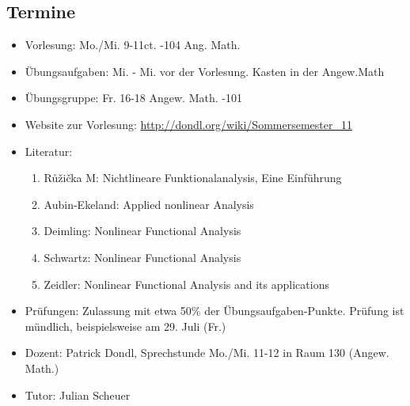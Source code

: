 \documentclass[14pt]{article}
\theoremstyle{plain}
\theoremstyle{nonumberplain}
\begin{document}
\subsection*{Termine}
\begin{itemize}
    \item Vorlesung: Mo./Mi. 9-11ct. -104 Ang. Math.
    \item Übungsaufgaben: Mi. - Mi. vor der Vorlesung. Kasten in der Angew.Math
    \item Übungsgruppe: Fr. 16-18 Angew. Math. -101
    \item Website zur Vorlesung: \url{http://dondl.org/wiki/Sommersemester_11}
    \item Literatur: \begin{enumerate}
        \item Růžička M: Nichtlineare Funktionalanalysis, Eine Einführung
        \item Aubin-Ekeland: Applied nonlinear Analysis
        \item Deimling: Nonlinear Functional Analysis
        \item Schwartz: Nonlinear Functional Analysis
        \item Zeidler: Nonlinear Functional Analysis and its applications 
        \end{enumerate}
    \item Prüfungen: Zulassung mit etwa 50\% der Übungsaufgaben-Punkte. Prüfung ist mündlich, 
            beispielsweise am 29. Juli (Fr.) 
    \item Dozent: Patrick Dondl, Sprechstunde Mo./Mi. 11-12 in Raum 130 (Angew. Math.)
    \item Tutor: Julian Scheuer
\end{itemize}

\newpage

\tableofcontents

\newpage

\end{document}
